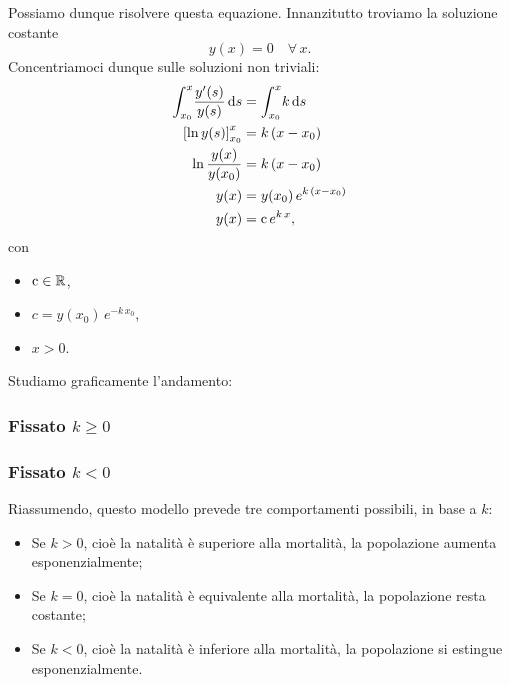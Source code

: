 \documentclass[../../analisi2]{subfiles}
\begin{document}
            Possiamo dunque risolvere questa equazione. Innanzitutto troviamo la soluzione costante
            \[
                y(x) = 0 \quad \forall \, x.
            \]
            Concentriamoci dunque sulle soluzioni non triviali:
            \begin{align*}
                \int_{x_0}^{x} \! \frac{y'(s)}{y(s)} \, \mathrm{d}s &= \int_{x_0}^{x} \! k \, \mathrm{d}s\\
                \left[\ln{y(s)}\right]_{x_0}^x &= k \, (x - x_0)\\
                \ln{\frac{y(x)}{y(x_0)}} &= k \, (x - x_0)\\
                y(x) &= y(x_0) \, e^{k \, (x - x_0)}\\
                y(x) &= \mathrm{c} \, e^{k \, x},
            \end{align*}
            \newpage
            con
            \begin{itemize}
                \item \(\mathrm{c} \in \mathbb{R}\),
                \item \(c = y(x_0) \, e^{-k \, x_0}\),
                \item \(x > 0\).
            \end{itemize}

            Studiamo graficamente l'andamento:

            \medskip

            \begin{minipage}[t]{.45\textwidth}
                \subsubsection*{Fissato \(k \geqslant 0\)}

                    

            \end{minipage}
            \hfill
            \begin{minipage}[t]{.45\textwidth}
                \subsubsection*{Fissato \(k < 0\)}

                    

            \end{minipage}

            \medskip

            Riassumendo, questo modello prevede tre comportamenti possibili, in base a \(k\):
            \begin{itemize}
                \item Se \(k > 0\), cioè la natalità è superiore alla mortalità, la popolazione aumenta esponenzialmente;
                \item Se \(k = 0\), cioè la natalità è equivalente alla mortalità, la popolazione resta costante;
                \item Se \(k < 0\), cioè la natalità è inferiore alla mortalità, la popolazione si estingue esponenzialmente.
            \end{itemize}
\end{document}
